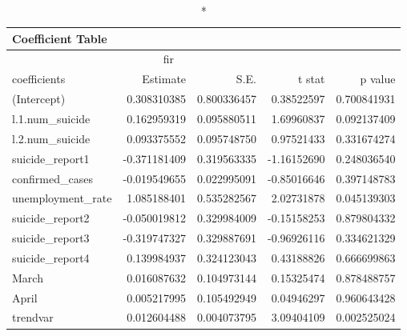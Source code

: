 \begin{longtable}{lrrrr}
\caption*{
{\large Coefficient Table}
} \\ 
\toprule
\multicolumn{4}{c}{fir} &  \\ 
\cmidrule(lr){1-4}
coefficients & Estimate & S.E. & t stat & p value \\ 
\midrule
(Intercept) & 0.308310385 & 0.800336457 & 0.38522597 & 0.700841931 \\ 
l.1.num\_suicide & 0.162959319 & 0.095880511 & 1.69960837 & 0.092137409 \\ 
l.2.num\_suicide & 0.093375552 & 0.095748750 & 0.97521433 & 0.331674274 \\ 
suicide\_report1 & -0.371181409 & 0.319563335 & -1.16152690 & 0.248036540 \\ 
confirmed\_cases & -0.019549655 & 0.022995091 & -0.85016646 & 0.397148783 \\ 
unemployment\_rate & 1.085188401 & 0.535282567 & 2.02731878 & 0.045139303 \\ 
suicide\_report2 & -0.050019812 & 0.329984009 & -0.15158253 & 0.879804332 \\ 
suicide\_report3 & -0.319747327 & 0.329887691 & -0.96926116 & 0.334621329 \\ 
suicide\_report4 & 0.139984937 & 0.324123043 & 0.43188826 & 0.666699863 \\ 
March & 0.016087632 & 0.104973144 & 0.15325474 & 0.878488757 \\ 
April & 0.005217995 & 0.105492949 & 0.04946297 & 0.960643428 \\ 
trendvar & 0.012604488 & 0.004073795 & 3.09404109 & 0.002525024 \\ 
\bottomrule
\end{longtable}

